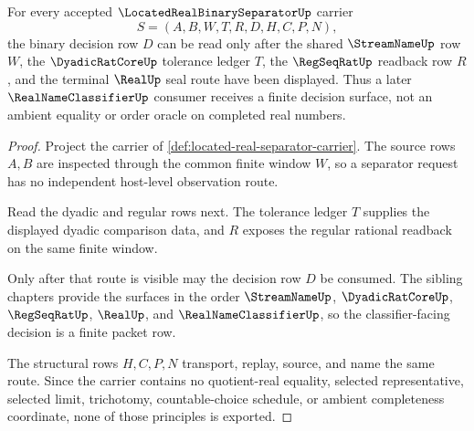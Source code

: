 \begin{theorem}
\label{thm:located-real-separator-dyadic-decision}
For every accepted $\LocatedRealBinarySeparatorUp$ carrier
$$
S=(A,B,W,T,R,D,H,C,P,N),
$$
the binary decision row $D$ can be read only after the shared $\StreamNameUp$ row $W$, the $\DyadicRatCoreUp$ tolerance ledger $T$, the $\RegSeqRatUp$ readback row $R$, and the terminal $\RealUp$ seal route have been displayed. Thus a later $\RealNameClassifierUp$ consumer receives a finite decision surface, not an ambient equality or order oracle on completed real numbers.
\end{theorem}
\begin{proof}
Project the carrier of \autoref{def:located-real-separator-carrier}. The source rows $A,B$ are inspected through the common finite window $W$, so a separator request has no independent host-level observation route.

Read the dyadic and regular rows next. The tolerance ledger $T$ supplies the displayed dyadic comparison data, and $R$ exposes the regular rational readback on the same finite window.

Only after that route is visible may the decision row $D$ be consumed. The sibling chapters provide the surfaces in the order $\StreamNameUp$, $\DyadicRatCoreUp$, $\RegSeqRatUp$, $\RealUp$, and $\RealNameClassifierUp$, so the classifier-facing decision is a finite packet row.

The structural rows $H,C,P,N$ transport, replay, source, and name the same route. Since the carrier contains no quotient-real equality, selected representative, selected limit, trichotomy, countable-choice schedule, or ambient completeness coordinate, none of those principles is exported.
\end{proof}

